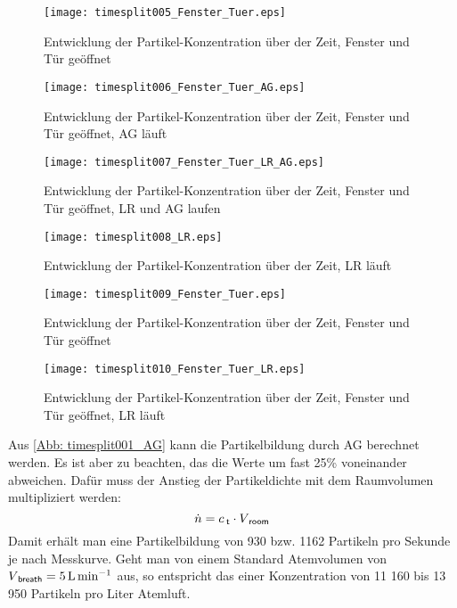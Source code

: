 \documentclass[12pt,a4paper,bibtotocnumbered,liststotocnumbered]{scrreprt}
\begin{document}
\begin{figure}[H]
\begin{minipage}[t]{0.49\textwidth}
\texttt{[image: timesplit005\_Fenster\_Tuer.eps]}
\caption{Entwicklung der Partikel-Konzentration über der Zeit, Fenster und Tür geöffnet}
\label{Abb: timesplit005_Fenster_Tuer}
\end{minipage}
\begin{minipage}[t]{0.49\textwidth}
\texttt{[image: timesplit006\_Fenster\_Tuer\_AG.eps]}
\caption{Entwicklung der Partikel-Konzentration über der Zeit, Fenster und Tür geöffnet, \acs{AG} läuft}
\label{Abb: timesplit006_Fenster_Tuer_AG}
\end{minipage}
\begin{minipage}[t]{0.49\textwidth}
\texttt{[image: timesplit007\_Fenster\_Tuer\_LR\_AG.eps]}
\caption{Entwicklung der Partikel-Konzentration über der Zeit,  Fenster und Tür geöffnet, \ac{LR} und \acs{AG} laufen}
\label{Abb: timesplit007_Fenster_Tuer_LR_AG}
\end{minipage}
\begin{minipage}[t]{0.49\textwidth}
\texttt{[image: timesplit008\_LR.eps]}
\caption{Entwicklung der Partikel-Konzentration über der Zeit, LR läuft}
\label{Abb: timesplit008_LR}
\end{minipage}
\end{figure}

\begin{figure}[H]
\begin{minipage}[t]{0.49\textwidth}
\texttt{[image: timesplit009\_Fenster\_Tuer.eps]}
\caption{Entwicklung der Partikel-Konzentration über der Zeit, Fenster und Tür geöffnet}
\label{Abb: timesplit009_Fenster_Tuer}
\end{minipage}
\begin{minipage}[t]{0.49\textwidth}
\texttt{[image: timesplit010\_Fenster\_Tuer\_LR.eps]}
\caption{Entwicklung der Partikel-Konzentration über der Zeit, Fenster und Tür geöffnet, \ac{LR} läuft}
\label{Abb: timesplit010_Fenster_Tuer_LR}
\end{minipage}
\end{figure}


Aus \autoref{Abb: timesplit001_AG} kann die Partikelbildung durch \acf{AG} berechnet werden. Es ist aber zu beachten, das die Werte um fast 25\% voneinander abweichen. Dafür muss der Anstieg der Partikeldichte mit dem Raumvolumen multipliziert werden:
\begin{equation}
\dot{n} = c_{\: \mathsf{t}} \cdot V_{\: \mathsf{room}} 
\end{equation}
Damit erhält man eine Partikelbildung von 930 bzw. 1162 Partikeln pro Sekunde je nach Messkurve. Geht man von einem Standard Atemvolumen von $V_{\: \mathsf{breath}} = \SI{5}{\liter\per\minute}$  aus, so entspricht das einer Konzentration von 11 160 bis 13 950 Partikeln pro Liter Atemluft. 
\end{document}

